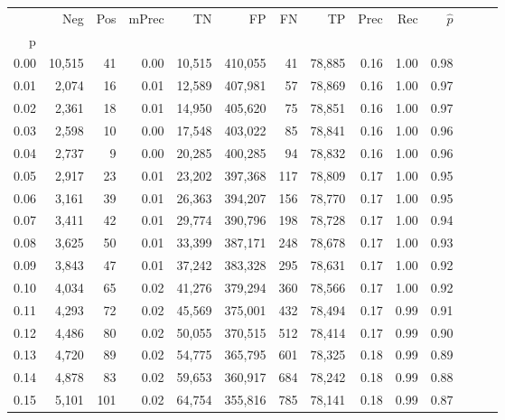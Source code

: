 \begin{tabular}{rrrrrrrrrrrrrr}
\toprule
{} &     Neg &    Pos & mPrec &       TN &       FP &      FN &      TP &  Prec &   Rec & $\hat{p}$ \\
p    &         &        &       &          &          &         &         &       &       &           \\
\midrule
0.00 &  10,515 &     41 &  0.00 &   10,515 &  410,055 &      41 &  78,885 &  0.16 &  1.00 &      0.98 \\
0.01 &   2,074 &     16 &  0.01 &   12,589 &  407,981 &      57 &  78,869 &  0.16 &  1.00 &      0.97 \\
0.02 &   2,361 &     18 &  0.01 &   14,950 &  405,620 &      75 &  78,851 &  0.16 &  1.00 &      0.97 \\
0.03 &   2,598 &     10 &  0.00 &   17,548 &  403,022 &      85 &  78,841 &  0.16 &  1.00 &      0.96 \\
0.04 &   2,737 &      9 &  0.00 &   20,285 &  400,285 &      94 &  78,832 &  0.16 &  1.00 &      0.96 \\
0.05 &   2,917 &     23 &  0.01 &   23,202 &  397,368 &     117 &  78,809 &  0.17 &  1.00 &      0.95 \\
0.06 &   3,161 &     39 &  0.01 &   26,363 &  394,207 &     156 &  78,770 &  0.17 &  1.00 &      0.95 \\
0.07 &   3,411 &     42 &  0.01 &   29,774 &  390,796 &     198 &  78,728 &  0.17 &  1.00 &      0.94 \\
0.08 &   3,625 &     50 &  0.01 &   33,399 &  387,171 &     248 &  78,678 &  0.17 &  1.00 &      0.93 \\
0.09 &   3,843 &     47 &  0.01 &   37,242 &  383,328 &     295 &  78,631 &  0.17 &  1.00 &      0.92 \\
0.10 &   4,034 &     65 &  0.02 &   41,276 &  379,294 &     360 &  78,566 &  0.17 &  1.00 &      0.92 \\
0.11 &   4,293 &     72 &  0.02 &   45,569 &  375,001 &     432 &  78,494 &  0.17 &  0.99 &      0.91 \\
0.12 &   4,486 &     80 &  0.02 &   50,055 &  370,515 &     512 &  78,414 &  0.17 &  0.99 &      0.90 \\
0.13 &   4,720 &     89 &  0.02 &   54,775 &  365,795 &     601 &  78,325 &  0.18 &  0.99 &      0.89 \\
0.14 &   4,878 &     83 &  0.02 &   59,653 &  360,917 &     684 &  78,242 &  0.18 &  0.99 &      0.88 \\
0.15 &   5,101 &    101 &  0.02 &   64,754 &  355,816 &     785 &  78,141 &  0.18 &  0.99 &      0.87 \\

\end{tabular}
